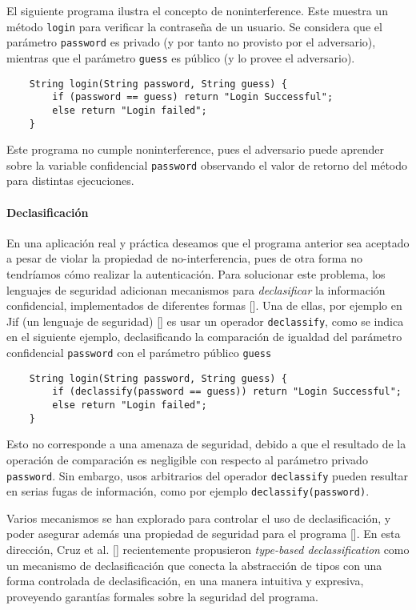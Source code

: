 \begin{intro}
		El siguiente programa ilustra el concepto de noninterference. Este muestra un método \texttt{login} para verificar la contraseña de un usuario. Se considera que el parámetro \texttt{password} es privado (y por tanto no provisto por el adversario), mientras que el parámetro \texttt{guess} es público (y lo provee el adversario).

		\begin{lstlisting}
	String login(String password, String guess) {
		if (password == guess) return "Login Successful";
		else return "Login failed";
	}
		\end{lstlisting}

		Este programa no cumple noninterference, pues el adversario puede aprender sobre la variable confidencial \texttt{password} observando el valor de retorno del método para distintas ejecuciones.

		\paragraph{Declasificación}
		En una aplicación real y práctica deseamos que el programa anterior sea aceptado a pesar de violar la propiedad de no-interferencia, pues de otra forma no tendríamos cómo realizar la autenticación. Para solucionar este problema, los lenguajes de seguridad adicionan mecanismos para \textit{declasificar} la información confidencial, implementados de diferentes formas []. Una de ellas, por ejemplo en Jif (un lenguaje de seguridad) [] es usar un operador \texttt{declassify}, como se indica en el siguiente ejemplo, declasificando la comparación de igualdad del parámetro confidencial \texttt{password} con el parámetro público \texttt{guess} %

		\begin{lstlisting}
	String login(String password, String guess) {
		if (declassify(password == guess)) return "Login Successful";
		else return "Login failed";
	}
		\end{lstlisting}

		Esto no corresponde a una amenaza de seguridad, debido a que el resultado de la operación de comparación es negligible con respecto al parámetro privado \texttt{password}. Sin embargo, usos arbitrarios del operador \texttt{declassify} pueden resultar en serias fugas de información, como por ejemplo \texttt{declassify(password)}.

		Varios mecanismos se han explorado para controlar el uso de declasificación, y poder asegurar además una propiedad de seguridad para el programa []. En esta dirección, Cruz et al. [] recientemente propusieron \textit{type-based declassification} como un mecanismo de declasificación que conecta la abstracción de tipos con una forma controlada de declasificación, en una manera intuitiva y expresiva, proveyendo garantías formales sobre la seguridad del programa. %


\end{intro}
